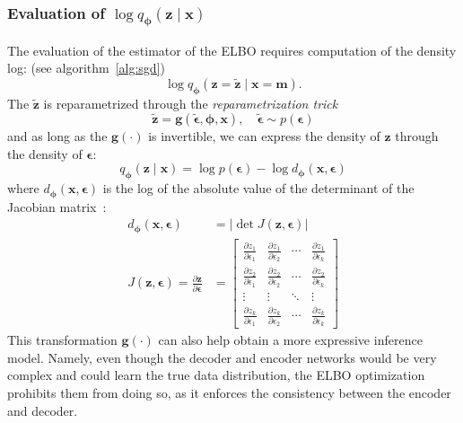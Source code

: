 \subsubsection{Evaluation of $\log q_{\boldsymbol{\phi}}(\boldsymbol{z}\mid \boldsymbol{x})$}
\label{subsubsec:log_q}
The evaluation of the estimator of the ELBO requires computation of the density log: (see algorithm~\ref{alg:sgd})
$$
\log q_{\boldsymbol{\phi}}(\boldsymbol{z}=\tilde{\boldsymbol{z}}\mid \boldsymbol{x}=\boldsymbol{m}).
$$ 
The $\tilde{\boldsymbol{z}}$ is reparametrized through the \textit{reparametrization trick}
$$
\tilde{\boldsymbol{z}} = \mathbf{g}(\tilde{\boldsymbol{\epsilon}},{\boldsymbol{\phi}},\mathbf{x}),\quad \tilde{\boldsymbol{\epsilon}} \sim p(\boldsymbol{\epsilon})
$$
and as long as the $\mathbf{g}(\cdot)$ is invertible, we can express the density of $\boldsymbol{z}$ through the density of $\boldsymbol{\epsilon}$:
$$
q_{\boldsymbol{\phi}}(\mathbf{z}\mid \mathbf{x}) = \log p(\boldsymbol{\epsilon}) - \log d_{\boldsymbol{\phi}}(\boldsymbol{x},\boldsymbol{\epsilon})
$$
where $d_{\boldsymbol{\phi}}(\boldsymbol{x},\boldsymbol{\epsilon})$ is the log of the absolute value of the determinant of the Jacobian 
matrix~\cite{intro-vae-2019}:
\begin{align*}
d_{\boldsymbol{\phi}}(\boldsymbol{x},\boldsymbol{\epsilon}) &= |\det J(\boldsymbol{z}, \boldsymbol{\epsilon})|\\
J(\boldsymbol{z}, \boldsymbol{\epsilon}) = \frac{\partial \boldsymbol{z}}{\partial \boldsymbol{\epsilon}} &=
\begin{bmatrix}
\frac{\partial z_1}{\partial \epsilon_1} & \frac{\partial z_1}{\partial \epsilon_2} & \cdots & \frac{\partial z_1}{\partial \epsilon_k} \\
\frac{\partial z_2}{\partial \epsilon_1} & \frac{\partial z_2}{\partial \epsilon_2} & \cdots & \frac{\partial z_2}{\partial \epsilon_k} \\
\vdots & \vdots & \ddots & \vdots \\
\frac{\partial z_k}{\partial \epsilon_1} & \frac{\partial z_k}{\partial \epsilon_2} & \cdots & \frac{\partial z_k}{\partial \epsilon_k}
\end{bmatrix}
\end{align*}
This transformation $\boldsymbol{g}(\cdot)$ can also help obtain a more expressive inference model.
Namely, even though the decoder and encoder networks would be very complex and could learn the true data distribution, 
the ELBO optimization prohibits them from doing so, as it enforces the consistency between the encoder and decoder.
